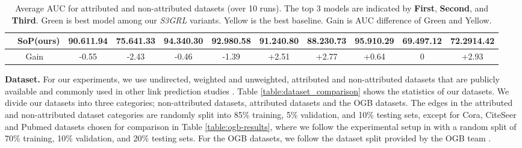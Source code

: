 \documentclass[sigconf, nonacm]{acmart}
\newcommand{\sop}{{S\lowercase{o}P}\xspace}
\newcommand{\ssgrl}{\textit{S3GRL}\xspace}
\newcommand{\first}{\textcolor[rgb]{0.9, 0.17, 0.31}}
\newcommand{\second}{\textcolor[rgb]{0.0, 0.0, 1.0}}
\newcommand{\third}{\textcolor[rgb]{0.55, 0.0, 0.55}}
\begin{document}
\begin{table*}[t]
{\begin{tabular}{p{12pt}|l|llll|lllll}
            & \sop (ours)                    & 90.61{\scriptsize1.94}                                     & 75.64{\scriptsize1.33}                                     & 94.34{\scriptsize0.30}                                     & 92.98{\scriptsize0.58}                                     & 91.24{\scriptsize0.80}                                     & 88.23{\scriptsize0.73}                                     & 95.91{\scriptsize0.29}                                     & 69.49{\scriptsize7.12}                                     & 72.29{\scriptsize14.42}                                     \\ 
\hline
\multicolumn{2}{c|}{Gain}                                                                          & \multicolumn{1}{c}{-0.55}                        & \multicolumn{1}{c}{-2.43}                        & \multicolumn{1}{c}{-0.46}                        & \multicolumn{1}{c|}{-1.39}                       & \multicolumn{1}{c}{+2.51}                         & \multicolumn{1}{c}{+2.77}                         & \multicolumn{1}{c}{+0.64}                         & \multicolumn{1}{c}{0}                            & \multicolumn{1}{c}{+2.93}                          \\
\bottomrule
\end{tabular}
}
\caption{Average AUC for attributed and non-attributed datasets (over 10 runs). The top 3 models are indicated by \textbf{\first{First}}, \textbf{\second{Second}}, and \textbf{\third{Third}}. \colorbox[rgb]{0.851,0.918,0.827}{Green} is best model among our \ssgrl variants. \colorbox[rgb]{1,0.949,0.8}{Yellow} is the best baseline. Gain is AUC difference of \colorbox[rgb]{0.851,0.918,0.827}{Green} and \colorbox[rgb]{1,0.949,0.8}{Yellow}.}
\label{auc-values}
\end{table*}

\vskip 1mm
\noindent \textbf{Dataset.} For our experiments, we use undirected, weighted and unweighted, attributed and non-attributed datasets that are publicly available and commonly used in other link prediction studies \cite{zhang2018link,zhang2018end,li2020distance,pan2022neural,louis2022sampling,chamberlain2023graph}. Table \ref{table:dataset_comparison} shows the statistics of our datasets. We divide our datasets into three categories; non-attributed datasets, attributed datasets and the OGB datasets. The edges in the attributed and non-attributed dataset categories are randomly split into 85\% training, 5\% validation, and 10\% testing sets, except for Cora, CiteSeer and Pubmed datasets chosen for comparison in Table \ref{table:ogb-results}, where we follow the experimental setup in \cite{chamberlain2023graph} with a random split of 70\% training, 10\% validation, and 20\% testing sets. For the OGB datasets, we follow the dataset split provided by the OGB team \cite{hu2021ogb}.
\end{document}
